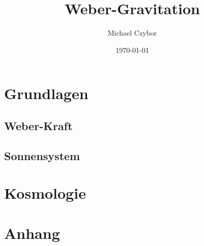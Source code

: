 \documentclass{book}
\numberwithin{equation}{section}
\begin{document}
\title{Weber-Gravitation}
\author{Michael Czybor}
\date{\today}
\maketitle

\tableofcontents

\part{Grundlagen}
\chapter{Weber-Kraft}





\chapter{Sonnensystem}

\part{Kosmologie}

\part{Anhang}


\end{document}
